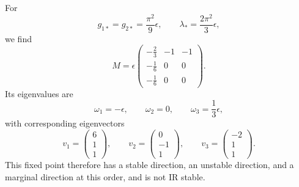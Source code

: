 \begin{solution}
For
\begin{equation}
g_{1*}=g_{2*}=\frac{\pi^2}{9}\epsilon,
\qquad
\lambda_*=\frac{2\pi^2}{3}\epsilon,
\end{equation}
we find
\begin{equation}
M
=
\epsilon
\begin{pmatrix}
-\frac23&-1&-1\\
-\frac16&0&0\\
-\frac16&0&0
\end{pmatrix}.
\end{equation}
Its eigenvalues are
\begin{equation}
\omega_1=-\epsilon,
\qquad
\omega_2=0,
\qquad
\omega_3=\frac13\epsilon,
\end{equation}
with corresponding eigenvectors
\begin{equation}
v_1=
\begin{pmatrix}6\\1\\1\end{pmatrix},
\qquad
v_2=
\begin{pmatrix}0\\-1\\1\end{pmatrix},
\qquad
v_3=
\begin{pmatrix}-2\\1\\1\end{pmatrix}.
\end{equation}
This fixed point therefore has a stable direction, an unstable direction, and a marginal direction at this order, and is not IR stable.


\end{solution}
